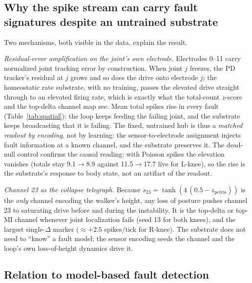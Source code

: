 \subsection{Why the spike stream can carry fault signatures despite an untrained substrate}

Two mechanisms, both visible in the data, explain the result.

\emph{Residual-error amplification on the joint's own electrode.} Electrodes
0--11 carry normalized joint tracking error by construction. When joint $j$
freezes, the PD tracker's residual at $j$ grows and so does the drive onto
electrode $j$; the homeostatic rate substrate, with no training, passes the
elevated drive straight through to an elevated firing rate, which is exactly
what the total-count $z$-score and the top-delta channel map see. Mean total
spikes rise in every fault (Table~\ref{tab:spatial}): the loop keeps feeding
the failing joint, and the substrate keeps broadcasting that it is failing. The
fixed, untrained hub is thus a \emph{matched readout by encoding}, not by
learning: the sensor-to-electrode assignment injects fault information at a
known channel, and the substrate preserves it. The dead-null control confirms
the causal reading: with Poisson spikes the elevation vanishes (totals stay
9.1$\rightarrow$8.9 against 11.5$\rightarrow$17.7 live for L-knee), so the rise
is the substrate's response to body state, not an artifact of the readout.

\emph{Channel 23 as the collapse telegraph.} Because $s_{23} =
\tanh(4\,(0.5 - z_{\mathrm{pelvis}}))$ is the \emph{only} channel encoding the
walker's height, any loss of posture pushes channel 23 to saturating drive
before and during the instability. It is the top-delta or top-MI channel
whenever joint localization fails (seed 13 for both knees), and the largest
single-$\Delta$ marker ($\approx +2.5$ spikes/tick for R-knee). The substrate
does not need to ``know'' a fault model; the sensor encoding seeds the channel
and the loop's own loss-of-height dynamics drive it.

\subsection{Relation to model-based fault detection}

